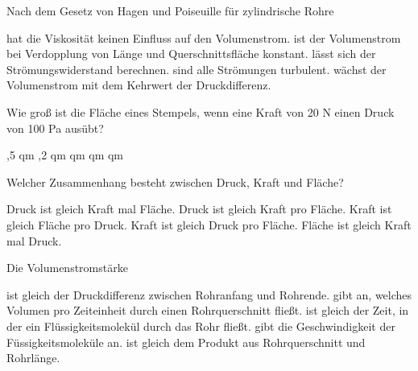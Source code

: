 \documentclass[11pt]{exam}
\begin{document}
\setlength{\voffset}{-0.5in}
\setlength{\headsep}{5pt}

\hspace{2mm}
 \hspace{5mm}
\vspace{4mm}

\begin{questions}

\question Nach dem Gesetz von Hagen und Poiseuille für zylindrische Rohre

\begin{choices}
	\choice hat die Viskosität keinen Einfluss auf den Volumenstrom.
	\choice ist der Volumenstrom bei Verdopplung von Länge und Querschnittsfläche konstant.
	\choice lässt sich der Strömungswiderstand berechnen.
	\choice sind alle Strömungen turbulent.
	\choice wächst der Volumenstrom mit dem Kehrwert der Druckdifferenz.
\end{choices}

\vspace{3mm}\question Wie groß ist die Fläche eines Stempels, wenn eine Kraft von 20 N einen Druck von 100 Pa ausübt?

\begin{choices}
	,5 qm
	,2 qm
	 qm
	 qm
	 qm
\end{choices}

\vspace{3mm}\question Welcher Zusammenhang besteht zwischen Druck, Kraft und Fläche?

\begin{choices}
	\choice Druck ist gleich Kraft mal Fläche.
	\choice Druck ist gleich Kraft pro Fläche.
	\choice Kraft ist gleich Fläche pro Druck.
	\choice Kraft ist gleich Druck pro Fläche.
	\choice Fläche ist gleich Kraft mal Druck.
\end{choices}

\vspace{3mm}\question Die Volumenstromstärke

\begin{choices}
	\choice ist gleich der Druckdifferenz zwischen Rohranfang und Rohrende.
	\choice gibt an, welches Volumen pro Zeiteinheit durch einen Rohrquerschnitt fließt.
	\choice ist gleich der Zeit, in der ein Flüssigkeitsmolekül durch das Rohr fließt.
	\choice gibt die Geschwindigkeit der Füssigkeitsmoleküle an.
	\choice ist gleich dem Produkt aus Rohrquerschnitt und Rohrlänge.
\end{choices}


\end{questions}
\end{document}
